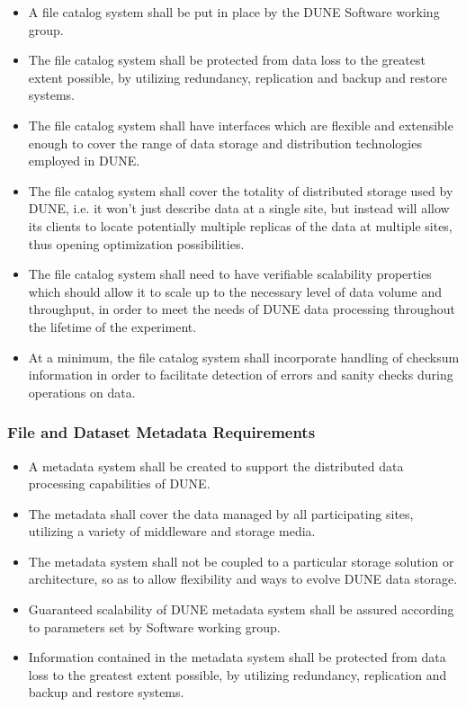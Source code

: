 \begin{itemize}
\item A file catalog system shall be put in place by the DUNE Software working group.


\item The file catalog system shall be protected from data loss to the greatest extent possible, by utilizing redundancy, replication and backup and restore systems.


\item The file catalog system shall have interfaces which are flexible and extensible enough to cover the range of data storage and distribution technologies employed in DUNE.

\item The file catalog system shall cover the totality of distributed storage used by DUNE, i.e. it won't just describe data at a single site, but instead will allow its clients to locate potentially multiple replicas of the data at multiple sites, thus opening optimization possibilities.

\item The file catalog system shall need to have verifiable scalability properties which should allow it to scale up to the necessary level of data volume and throughput, in order to meet the needs of DUNE data processing throughout the lifetime of the experiment.

\item At a minimum, the file catalog system shall incorporate handling of checksum information in order to facilitate detection of errors and sanity checks during operations on data.

\end{itemize}

\subsubsection{File and Dataset Metadata Requirements}

\begin{itemize}
\item A metadata system shall be created to support the distributed data processing capabilities of DUNE.

\item The metadata shall cover the data managed by all participating sites, utilizing a variety of middleware and storage media.

\item The metadata system shall not be coupled to a particular storage solution or architecture, so as to allow flexibility and ways to evolve DUNE data storage.

\item Guaranteed scalability of DUNE metadata system shall be assured according to parameters set by Software working group.

\item Information contained in the metadata system shall be protected from data loss to the greatest extent possible, by utilizing redundancy, replication and backup and restore systems.

\end{itemize}

